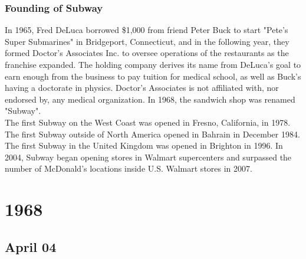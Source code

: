 \documentclass[11pt]{report}
\begin{document}
\subsection{Founding of Subway}
In 1965, Fred DeLuca borrowed \$1,000 from friend Peter Buck to start "Pete's Super Submarines" in Bridgeport, Connecticut, and in the following year, they formed Doctor's Associates Inc. to oversee operations of the restaurants as the franchise expanded. The holding company derives its name from DeLuca's goal to earn enough from the business to pay tuition for medical school, as well as Buck's having a doctorate in physics. Doctor's Associates is not affiliated with, nor endorsed by, any medical organization. In 1968, the sandwich shop was renamed "Subway".\\
\indent The first Subway on the West Coast was opened in Fresno, California, in 1978. The first Subway outside of North America opened in Bahrain in December 1984. The first Subway in the United Kingdom was opened in Brighton in 1996. In 2004, Subway began opening stores in Walmart supercenters and surpassed the number of McDonald's locations inside U.S. Walmart stores in 2007.

\chapter{1968}
\section{April 04}
\end{document}
